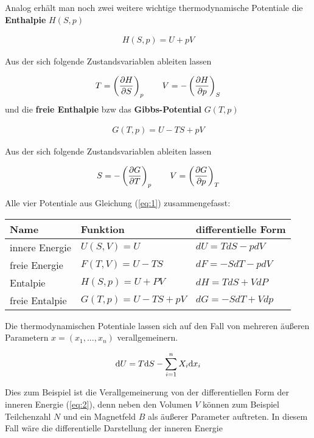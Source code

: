 Analog erhält man noch zwei weitere wichtige thermodynamische Potentiale die \textbf{Enthalpie} \(H(S,p)\) 

\begin{align}
  \label{eq:10}
  H(S,p) = U + pV
\end{align}

Aus der sich folgende Zustandsvariablen ableiten lassen

\begin{align}
  \label{eq:11}
  T= \left(\pdiff H_S \right)_p  \qquad V = - \left(\pdiff H_p \right)_S 
\end{align}
und die \textbf{freie Enthalpie} bzw das \textbf{Gibbs-Potential} \(G(T,p)\)

\begin{align}
  \label{eq:12}
  G(T,p) = U - TS + pV
\end{align}

Aus der sich folgende Zustandsvariablen ableiten lassen

\begin{align}
  \label{eq:13}
  S= -\left(\pdiff G_T \right)_p  \qquad V =  \left(\pdiff G_p \right)_T
\end{align}

Alle vier Potentiale aus Gleichung (\ref{eq:1}) zusammengefasst:


\begin{table}[h]
  \centering
  \begin{tabular}{lll}
    Name&Funktion&differentielle Form\\
\hline
innere Energie&\(U(S,V)=U\)&\(dU = TdS-pdV\)\\
freie Energie&\(F(T,V)=U-TS\)&\(dF=-SdT-pdV\)\\
Entalpie & \(H(S,p)=U+PV\)&\(dH = TdS+VdP\)\\
freie Entalpie & \(G(T,p)=U-TS+pV\)&\(dG = -SdT+Vdp\)
  \end{tabular}
\end{table}


Die thermodynamischen Potentiale lassen sich auf den Fall von mehreren äußeren Parametern \(x= (x_1,...,x_n)\) verallgemeinern. 

\begin{align}
  \label{eq:14}
  \diff U = T\diff S - \sum_{i=1}^n X_i \diff{} x_i
\end{align}

Dies zum Beispiel ist die Verallgemeinerung von der differentiellen Form der inneren Energie (\ref{eq:2}), denn neben den Volumen \(V\) können zum Beispiel Teilchenzahl \(N\) und ein Magnetfeld \(B\) als äußerer Parameter auftreten. In diesem Fall wäre die differentielle Darstellung der inneren Energie

